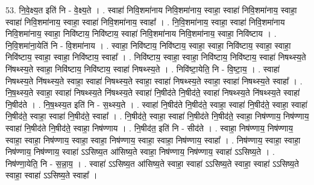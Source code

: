 \documentclass[17pt]{extarticle}
\begin{document}
53. नि॒वे॒क्ष्य॒त इति॑ नि - वे॒क्ष्य॒ते । . स्वाहा॑ निवि॒शमा॑नाय निवि॒शमा॑नाय॒ स्वाहा॒ स्वाहा॑ निवि॒शमा॑नाय॒ स्वाहा॒ स्वाहा॑ निवि॒शमा॑नाय॒ स्वाहा॒ स्वाहा॑ निवि॒शमा॑नाय॒ स्वाहा᳚ । . नि॒वि॒शमा॑नाय॒ स्वाहा॒ स्वाहा॑ निवि॒शमा॑नाय निवि॒शमा॑नाय॒ स्वाहा॒ निवि॑ष्टाय॒ निवि॑ष्टाय॒ स्वाहा॑ निवि॒शमा॑नाय निवि॒शमा॑नाय॒ स्वाहा॒ निवि॑ष्टाय । . नि॒वि॒शमा॑ना॒येति॑ नि - वि॒शमा॑नाय । . स्वाहा॒ निवि॑ष्टाय॒ निवि॑ष्टाय॒ स्वाहा॒ स्वाहा॒ निवि॑ष्टाय॒ स्वाहा॒ स्वाहा॒ निवि॑ष्टाय॒ स्वाहा॒ स्वाहा॒ निवि॑ष्टाय॒ स्वाहा᳚ । . निवि॑ष्टाय॒ स्वाहा॒ स्वाहा॒ निवि॑ष्टाय॒ निवि॑ष्टाय॒ स्वाहा॑ निषथ्स्य॒ते नि॑षथ्स्य॒ते स्वाहा॒ निवि॑ष्टाय॒ निवि॑ष्टाय॒ स्वाहा॑ निषथ्स्य॒ते । . निवि॑ष्टा॒येति॒ नि - वि॒ष्टा॒य॒ । . स्वाहा॑ निषथ्स्य॒ते नि॑षथ्स्य॒ते स्वाहा॒ स्वाहा॑ निषथ्स्य॒ते स्वाहा॒ स्वाहा॑ निषथ्स्य॒ते स्वाहा॒ स्वाहा॑ निषथ्स्य॒ते स्वाहा᳚ । . नि॒ष॒थ्स्य॒ते स्वाहा॒ स्वाहा॑ निषथ्स्य॒ते नि॑षथ्स्य॒ते स्वाहा॑ नि॒षीद॑ते नि॒षीद॑ते॒ स्वाहा॑ निषथ्स्य॒ते नि॑षथ्स्य॒ते स्वाहा॑ नि॒षीद॑ते । . नि॒ष॒थ्स्य॒त इति॑ नि - स॒थ्स्य॒ते । . स्वाहा॑ नि॒षीद॑ते नि॒षीद॑ते॒ स्वाहा॒ स्वाहा॑ नि॒षीद॑ते॒ स्वाहा॒ स्वाहा॑ नि॒षीद॑ते॒ स्वाहा॒ स्वाहा॑ नि॒षीद॑ते॒ स्वाहा᳚ । . नि॒षीद॑ते॒ स्वाहा॒ स्वाहा॑ नि॒षीद॑ते नि॒षीद॑ते॒ स्वाहा॒ निष॑ण्णाय॒ निष॑ण्णाय॒ स्वाहा॑ नि॒षीद॑ते नि॒षीद॑ते॒ स्वाहा॒ निष॑ण्णाय । . नि॒षीद॑त॒ इति॑ नि - सीद॑ते । . स्वाहा॒ निष॑ण्णाय॒ निष॑ण्णाय॒ स्वाहा॒ स्वाहा॒ निष॑ण्णाय॒ स्वाहा॒ स्वाहा॒ निष॑ण्णाय॒ स्वाहा॒ स्वाहा॒ निष॑ण्णाय॒ स्वाहा᳚ । . निष॑ण्णाय॒ स्वाहा॒ स्वाहा॒ निष॑ण्णाय॒ निष॑ण्णाय॒ स्वाहा॑ ऽऽसिष्य॒त आ॑सिष्य॒ते स्वाहा॒ निष॑ण्णाय॒ निष॑ण्णाय॒ स्वाहा॑ ऽऽसिष्य॒ते । . निष॑ण्णा॒येति॒ नि - स॒न्ना॒य॒ । . स्वाहा॑ ऽऽसिष्य॒त आ॑सिष्य॒ते स्वाहा॒ स्वाहा॑ ऽऽसिष्य॒ते स्वाहा॒ स्वाहा॑ ऽऽसिष्य॒ते स्वाहा॒ स्वाहा॑ ऽऽसिष्य॒ते स्वाहा᳚ । \newline
\pagebreak
{}
\end{document}
